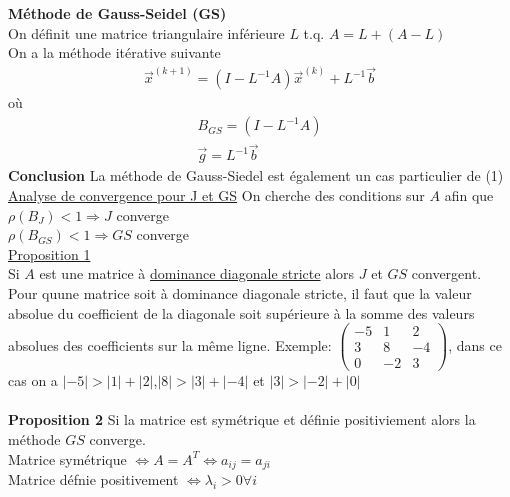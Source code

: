 \textbf{Méthode de Gauss-Seidel (GS)}
\\
On définit une matrice triangulaire inférieure $L$ t.q. $A=L+(A-L)$
\\On a la méthode itérative suivante
\begin{eqnarray}
	\overrightarrow x^{(k+1)}=(I-L^{-1}A)\overrightarrow x^{(k)}+L^{-1}\overrightarrow{b}
\end{eqnarray}
où
\begin{eqnarray*}
	B_{GS}=(I-L^{-1}A)
	\\
	\overrightarrow g = L^{-1}\overrightarrow{b}
\end{eqnarray*}
\textbf{Conclusion} La méthode de Gauss-Siedel est également un cas particulier de (1)
\\
\underline{Analyse de convergence pour J et GS}
On cherche des conditions sur $A$ afin que 
\\$\rho(B_J)<1\Rightarrow J$ converge
\\$\rho(B_{GS})<1\Rightarrow GS$ converge
\\\underline{Proposition 1}
\\
Si $A$ est une matrice à \underline{dominance diagonale stricte} alors $J$ et $GS$ convergent.
\\
Pour quune matrice soit à dominance diagonale stricte, il faut que la valeur absolue du coefficient de la diagonale soit supérieure à la somme des valeurs absolues des coefficients sur la même ligne. Exemple:
$
	\begin{pmatrix} 
		-5   & 1      & 2       
	\\ 3      & 8    & -4
	\\ 0 & -2 & 3  
 \end{pmatrix}$, dans ce cas on a $|-5|>|1|+|2|$,$|8|>|3|+|-4|$ et $|3|>|-2|+|0|$
\\\\
\textbf{Proposition 2} Si la matrice est symétrique et définie positiviement alors la méthode $GS$ converge.
\\Matrice symétrique $\Leftrightarrow A=A^T\Leftrightarrow a_{ij}=a_{ji}$
\\Matrice défnie positivement $\Leftrightarrow \lambda_i>0 \forall i$

